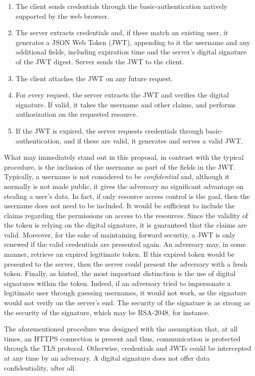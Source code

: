 \documentclass[12pt]{article}
\begin{document}
\begin{enumerate}
\item The client sends credentials through the basic-authentication natively supported by the web browser.
\item The server extracts credentials and, if these match an existing user, it generates a JSON Web Token (JWT), appending to it the username and any additional fields, including expiration time and the server's digital signature of the JWT digest. Server sends the JWT to the client.
\item The client attaches the JWT on any future request.
\item For every request, the server extracts the JWT and verifies the digital signature. If valid, it takes the username and other claims, and performs authorization on the requested resource.
\item If the JWT is expired, the server requests credentials through basic-authentication, and if these are valid, it generates and serves a valid JWT.
\end{enumerate}

What may immediately stand out in this proposal, in contrast with the typical procedure, is the inclusion of the username as part of the fields in the JWT. Typically, a username is not considered to be \emph{confidential} and, although it normally is not made public, it gives the adversary no significant advantage on stealing a user's data. In fact, if only resource access control is the goal, then the username does not need to be included. It would be sufficient to include the claims regarding the permissions on access to the resources. Since the validity of the token is relying on the digital signature, it is guaranteed that the claims are valid. Moreover, for the sake of maintaining forward securtiy, a JWT is only renewed if the valid credentials are presented again. An adversary may, in some manner, retrieve an expired legitimate token. If this expired token would be presented to the server, then the server could present the adversary with a fresh token. Finally, as hinted, the most important distinction is the use of digital signatures within the token. Indeed, if an adversary tried to impersonate a legitimate user through guessing usernames, it would not work, as the signature would not verify on the server's end. The security of the signature is as strong as the security of the signature, which may be RSA-2048, for instance. 

The aforementioned procedure was designed with the assumption that, at all times, an HTTPS connection is present and thus, communication is protected through the TLS protocol. Otherwise, credentials and JWTs could be intercepted at any time by an adversary. A digital signature does not offer data confidentiality, after all.
\end{document}
